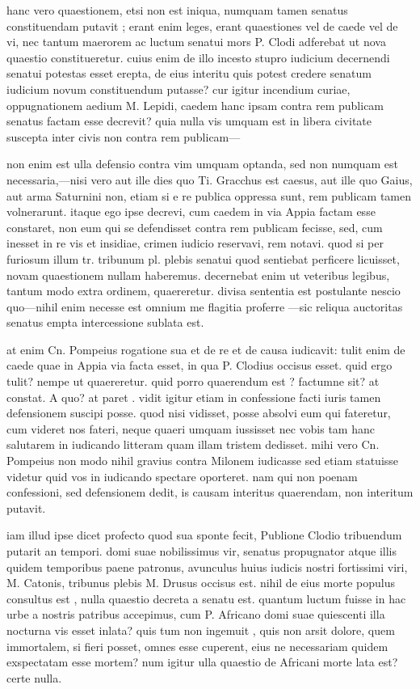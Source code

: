 hanc vero quaestionem, etsi non est iniqua, numquam tamen senatus constituendam putavit ; erant enim leges, erant quaestiones vel de caede vel de vi, nec tantum maerorem ac luctum senatui mors P. Clodi adferebat ut nova quaestio constitueretur. cuius enim de illo incesto stupro iudicium decernendi senatui potestas esset erepta, de eius interitu quis potest credere senatum iudicium novum constituendum putasse? cur igitur incendium curiae, oppugnationem aedium M. Lepidi, caedem hanc ipsam contra rem publicam senatus factam esse decrevit? quia nulla vis umquam est in libera civitate suscepta inter civis non contra rem publicam—

 non enim est ulla defensio contra vim umquam optanda, sed non numquam est necessaria,—nisi vero aut ille dies quo Ti. Gracchus est caesus, aut ille quo Gaius, aut arma Saturnini non, etiam si e re publica oppressa sunt, rem publicam tamen volnerarunt. itaque ego ipse decrevi, cum caedem in via Appia factam esse constaret, non eum qui se defendisset contra rem publicam fecisse, sed, cum inesset in re vis et insidiae, crimen iudicio reservavi, rem notavi. quod si per furiosum illum tr. tribunum pl. plebis senatui quod sentiebat perficere licuisset, novam quaestionem nullam haberemus. decernebat enim ut veteribus legibus, tantum modo extra ordinem, quaereretur. divisa sententia est postulante nescio quo—nihil enim necesse est omnium me flagitia proferre —sic reliqua auctoritas senatus empta intercessione sublata est.

 at enim Cn. Pompeius rogatione sua et de re et de causa iudicavit: tulit enim de caede quae in Appia via facta esset, in qua P. Clodius occisus esset. quid ergo tulit? nempe ut quaereretur. quid porro quaerendum est ? factumne sit? at constat. A quo? at paret . vidit igitur etiam in confessione facti iuris tamen defensionem suscipi posse. quod nisi vidisset, posse absolvi eum qui fateretur, cum videret nos fateri, neque quaeri umquam iussisset nec vobis tam hanc salutarem in iudicando litteram quam illam tristem dedisset. mihi vero Cn. Pompeius non modo nihil gravius contra Milonem iudicasse sed etiam statuisse videtur quid vos in iudicando spectare oporteret. nam qui non poenam confessioni, sed defensionem dedit, is causam interitus quaerendam, non interitum putavit.

 iam illud ipse dicet profecto quod sua sponte fecit, Publione Clodio tribuendum putarit an tempori. domi suae nobilissimus vir, senatus propugnator atque illis quidem temporibus paene patronus, avunculus huius iudicis nostri fortissimi viri, M. Catonis, tribunus plebis M. Drusus occisus est. nihil de eius morte populus consultus est , nulla quaestio decreta a senatu est. quantum luctum fuisse in hac urbe a nostris patribus accepimus, cum P. Africano domi suae quiescenti illa nocturna vis esset inlata? quis tum non ingemuit , quis non arsit dolore, quem immortalem, si fieri posset, omnes esse cuperent, eius ne necessariam quidem exspectatam esse mortem? num igitur ulla quaestio de Africani morte lata est? certe nulla.

